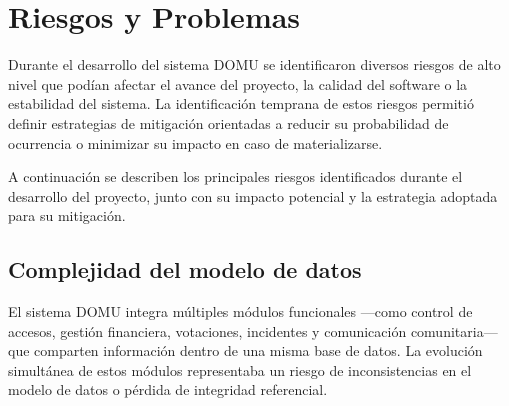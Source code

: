 

\section{Riesgos y Problemas}

Durante el desarrollo del sistema DOMU se identificaron diversos riesgos de alto nivel que podían afectar el avance del proyecto, la calidad del software o la estabilidad del sistema. 
La identificación temprana de estos riesgos permitió definir estrategias de mitigación orientadas a reducir su probabilidad de ocurrencia o minimizar su impacto en caso de materializarse.

A continuación se describen los principales riesgos identificados durante el desarrollo del proyecto, junto con su impacto potencial y la estrategia adoptada para su mitigación.

\subsection*{Complejidad del modelo de datos}

El sistema DOMU integra múltiples módulos funcionales —como control de accesos, gestión financiera, votaciones, incidentes y comunicación comunitaria— que comparten información dentro de una misma base de datos. 
La evolución simultánea de estos módulos representaba un riesgo de inconsistencias en el modelo de datos o pérdida de integridad referencial.

